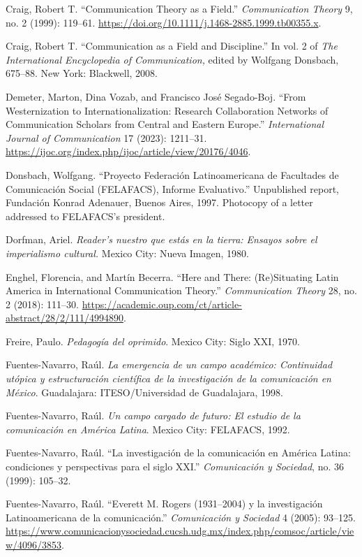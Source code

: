 \documentclass{tufte-handout}
\begin{document}
\begin{hangparas}{.25in}{1}
Craig, Robert T. ``Communication Theory as a Field.''
\emph{Communication Theory} 9, no. 2 (1999): 119--61.
\url{https://doi.org/10.1111/j.1468-2885.1999.tb00355.x}.

Craig, Robert T. ``Communication as a Field and Discipline.'' In vol. 2
of \emph{The International Encyclopedia of Communication,} edited by
Wolfgang Donsbach, 675--88. New York: Blackwell, 2008.

Demeter, Marton, Dina Vozab, and Francisco José Segado-Boj. ``From
Westernization to Internationalization: Research Collaboration Networks
of Communication Scholars from Central and Eastern Europe.''
\emph{International Journal of Communication} 17 (2023): 1211--31.
\url{https://ijoc.org/index.php/ijoc/article/view/20176/4046}.

Donsbach, Wolfgang. ``Proyecto Federación Latinoamericana de Facultades
de Comunicación Social (FELAFACS), Informe Evaluativo.'' Unpublished
report, Fundación Konrad Adenauer, Buenos Aires, 1997. Photocopy of a
letter addressed to FELAFACS's president.

Dorfman, Ariel. \emph{Reader's nuestro que estás en la tierra: Ensayos
sobre el imperialismo cultural.} Mexico City: Nueva Imagen, 1980.

Enghel, Florencia, and Martín Becerra. ``Here and There: (Re)Situating
Latin America in International Communication Theory.''
\emph{Communication Theory} 28, no. 2 (2018): 111--30.
\url{https://academic.oup.com/ct/article-abstract/28/2/111/4994890}.

Freire, Paulo. \emph{Pedagogía del oprimido}. Mexico City: Siglo XXI,
1970.

Fuentes-Navarro, Raúl. \emph{La emergencia de un campo académico:
Continuidad utópica y estructuración científica de la investigación de
la comunicación en México}. Guadalajara: ITESO/Universidad de
Guadalajara, 1998.

Fuentes-Navarro, Raúl. \emph{Un campo cargado de futuro: El estudio de
la comunicación en América Latina}. Mexico City: FELAFACS, 1992.

Fuentes-Navarro, Raúl. ``La investigación de la comunicación en América
Latina: condiciones y perspectivas para el siglo XXI.''
\emph{Comunicación y Sociedad}, no. 36 (1999): 105--32.

Fuentes-Navarro, Raúl. ``Everett M. Rogers (1931--2004) y la
investigación Latinoamericana de la comunicación.'' \emph{Comunicación y
Sociedad} 4 (2005): 93--125.
\url{https://www.comunicacionysociedad.cucsh.udg.mx/index.php/comsoc/article/view/4096/3853}.


\end{hangparas}
\end{document}
